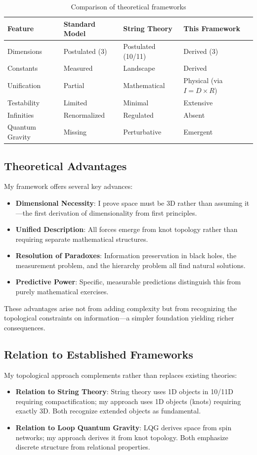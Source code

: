 \documentclass{article}
\begin{document}
\begin{table}[h]
\centering
\begin{tabular}{|l|l|l|l|}
\hline
Feature & Standard Model & String Theory & This Framework \\
\hline
Dimensions & Postulated (3) & Postulated (10/11) & Derived (3) \\
Constants & Measured & Landscape & Derived \\
Unification & Partial & Mathematical & Physical (via $I = D \times R$) \\
Testability & Limited & Minimal & Extensive \\
Infinities & Renormalized & Regulated & Absent \\
Quantum Gravity & Missing & Perturbative & Emergent \\
\hline
\end{tabular}
\caption{Comparison of theoretical frameworks}
\label{tab:comparison}
\end{table}

\subsection{Theoretical Advantages}
My framework offers several key advances:
\begin{itemize}
\item \textbf{Dimensional Necessity}: I prove space must be 3D rather than assuming it—the first derivation of dimensionality from first principles.
\item \textbf{Unified Description}: All forces emerge from knot topology rather than requiring separate mathematical structures.
\item \textbf{Resolution of Paradoxes}: Information preservation in black holes, the measurement problem, and the hierarchy problem all find natural solutions.
\item \textbf{Predictive Power}: Specific, measurable predictions distinguish this from purely mathematical exercises.
\end{itemize}

These advantages arise not from adding complexity but from recognizing the topological constraints on information—a simpler foundation yielding richer consequences.

\subsection{Relation to Established Frameworks}
My topological approach complements rather than replaces existing theories:
\begin{itemize}
\item \textbf{Relation to String Theory}: String theory uses 1D objects in 10/11D requiring compactification; my approach uses 1D objects (knots) requiring exactly 3D. Both recognize extended objects as fundamental.
\item \textbf{Relation to Loop Quantum Gravity}: LQG derives space from spin networks; my approach derives it from knot topology. Both emphasize discrete structure from relational properties.
\end{itemize}
\end{document}
